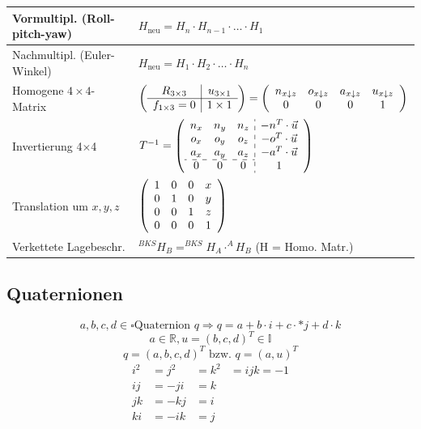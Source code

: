 \documentclass[8pt,a4paper,landscape]{scrartcl}
\begin{document}
\begin{multicols*}{3}
\begin{tabularx}{\columnwidth}{X|m{}}
Vormultipl. (Roll-pitch-yaw) & $ H_{\text{neu}} = H_n \cdot H_{n-1} \cdot \ldots \cdot H_1 $\\ \hline
Nachmultipl. (Euler-Winkel) & $ H_{\text{neu}} = H_1 \cdot H_2 \cdot \ldots \cdot H_n $\\ \hline
Homogene $4\times4$-Matrix & $\left(\begin{Array}{c|c}
	R_{3\times3} & u_{3\times1}\\ \hline
	f_{1\times3} = 0 & 1\times1
\end{Array}\right) = \left(\begin{Array}{cccc}
n_{x\downarrow z} & o_{x\downarrow z} & a_{x\downarrow z} & u_{x\downarrow z}\\
0 & 0& 0 & 1
\end{Array}\right)$\\ \hline
Invertierung 4$\times$4 &  $T^{-1} = \left(\begin{Array}{ccc:c}
	n_{x} & n_{y} & n_{z} & -n^{T}\cdot\vec{u}\\
	o_{x} & o_{y} & o_{z} & -o^{T}\cdot\vec{u}\\
	a_{x} & a_{y} & a_{z} & -a^{T}\cdot\vec{u}\\ \cdashline{1-3}
	0 & 0&0&1
\end{Array}\right)$\\ \hline
Translation um $ x,y,z $ & $ \left(\begin{Array}{cccc}
	1 & 0 & 0 & x\\
	0 & 1 & 0 & y\\
	0 & 0 & 1 & z\\
	0 & 0 & 0 & 1
\end{Array}\right) $\\ \hline
Verkettete Lagebeschr.& $ ^{BKS}H_{B}  = ^{BKS}H_{A} \cdot ^{A}H_{B}$ \hfill (H = Homo. Matr.)\\ 
\end{tabularx}

\subsection*{Quaternionen}
$$a,b,c,d \in \square \text{Quaternion } q \Rightarrow q = a + b\cdot i + c \cdot * j + d \cdot k $$
$$a \in \mathbb{R}, u = (b,c,d)^T \in \mathbb{I}$$
$$q = (a,b,c,d)^T \text{ bzw. } q=(a,u)^T$$
\begin{alignat*}{3}
	i^2 &= j^2 &= k^2 &= ijk = -1\\
	ij &= -ji &= k\\
	jk &= -kj &= i\\
	ki &= -ik &= j
\end{alignat*}


\end{multicols*}
\end{document}
